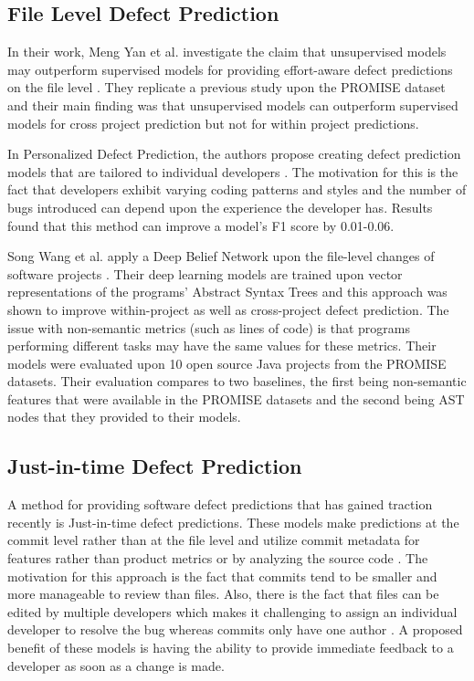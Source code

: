 \documentclass[../main.tex]{subfiles}
\begin{document}
\subsection{File Level Defect Prediction }

In their work, Meng Yan et al. investigate the claim that unsupervised models may outperform supervised models for providing effort-aware defect predictions on the file level \cite{yan2017file}. They replicate a previous study upon the PROMISE dataset and their main finding was that unsupervised models can outperform supervised models for cross project prediction but not for within project predictions. 

In Personalized Defect Prediction, the authors propose creating defect prediction models that are tailored to individual developers \cite{jiang2013personalized}. The motivation for this is the fact that developers exhibit varying coding patterns and styles and the number of bugs introduced can depend upon the experience the developer has. Results found that this method can improve a model's F1 score by 0.01-0.06.

Song Wang et al. apply a Deep Belief Network upon the file-level changes of software projects \cite{wang2016automatically}. Their deep learning models are trained upon vector representations of the programs' Abstract Syntax Trees and this approach was shown to improve within-project as well as cross-project defect prediction. The issue with non-semantic metrics (such as lines of code) is that programs performing different tasks may have the same values for these metrics. Their models were evaluated upon 10 open source Java projects from the PROMISE datasets. Their evaluation compares to two baselines, the first being non-semantic features that were available in the PROMISE datasets and the second being AST nodes that they provided to their models. 


\subsection{Just-in-time Defect Prediction}

A method for providing software defect predictions that has gained traction recently is Just-in-time defect predictions. These models make predictions at the commit level rather than at the file level and utilize commit metadata for features rather than product metrics or by analyzing the source code \cite{kamei2013large}. The motivation for this approach is the fact that commits tend to be smaller and more manageable to review than files. Also, there is the fact that files can be edited by multiple developers which makes it challenging to assign an individual developer to resolve the bug whereas commits only have one author \cite{kamei2013large}. A proposed benefit of these models is having the ability to provide immediate feedback to a developer as soon as a change is made. 
\end{document}
